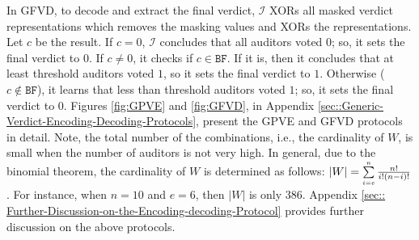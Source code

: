 In GFVD, to decode and extract the final verdict,  $\mathcal{I}$  XORs all masked verdict representations which  removes the masking values and XORs the representations. Let $c$ be the result.  If $c=0$,  $\mathcal{I}$ concludes that all auditors  voted $0$; so, it sets the final verdict to $0$. If $c\neq 0$,  it checks if $c\in \mathtt{BF}$. If it is, then it concludes that at least threshold auditors voted $1$, so it sets the final verdict to $1$. Otherwise ($c\notin \mathtt{BF}$), it learns that less than threshold auditors voted $1$; so, it sets the final verdict to $0$.  Figures \ref{fig:GPVE} and \ref{fig:GFVD}, in Appendix \ref{sec::Generic-Verdict-Encoding-Decoding-Protocols}, present the  GPVE and GFVD protocols in detail. Note, the total number of the combinations, i.e., the cardinality of $W$, is  small when the number of auditors is not very high. In general,  due to the  binomial theorem, the cardinality of $W$ is determined as follows: $|W|=\sum\limits_{\scriptscriptstyle i=e}^{\scriptscriptstyle n}\frac{n!}{i!(n- i)!}$. 
%
 For instance, when $n=10$ and  $e=6$, then $|W|$ is only $386$. Appendix \ref{sec:: Further-Discussion-on-the-Encoding-decoding-Protocol} provides  further discussion on the above protocols.
 
 
% 
 
 
 
 

 
 




